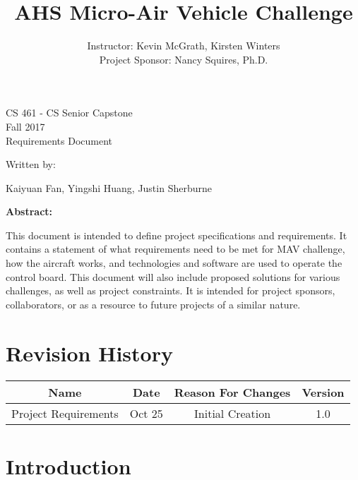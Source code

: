 \documentclass[letterpaper, 10, draftclsnofoot, onecolumn]{IEEEtran}
\date{}
\title{AHS Micro-Air Vehicle Challenge}
\author{ Instructor: Kevin McGrath, Kirsten Winters \\
    Project Sponsor: Nancy Squires, Ph.D.
}
\def\class{CS 461 - CS Senior Capstone}
\def\term{Fall 2017}
\begin{document}
\null  %
\nointerlineskip  %
\vfill
\let\snewpage \newpage
\let\newpage \relax
\maketitle
\begin{center}
\class\\
\term\\
\huge{Requirements Document}\par
\vspace{2mm}
\large{Written by:}\par
\normalsize{Kaiyuan Fan, Yingshi Huang, Justin Sherburne}\par
\vspace{8mm}
\large{\textbf{Abstract:}}\par 
\end{center}
\vspace{2mm}
\normalsize{
This document is intended to define project specifications and requirements. It contains a statement of what requirements need to be met for MAV challenge, how the aircraft works, and technologies and software are used to operate the control board. This document will also include proposed solutions for various challenges, as well as project constraints. It is intended for project sponsors, collaborators, or as a resource to future projects of a similar nature.

}

\let \newpage \snewpage
\vfill 
\break %

\tableofcontents


\section*{Revision History}

\begin{center}
    \begin{tabular}{|c|c|c|c|}
        \hline
	    Name & Date & Reason For Changes & Version\\
        \hline
	    Project Requirements & Oct 25 & Initial Creation & 1.0\\
        \hline
    \end{tabular}
\end{center}

\section{Introduction}
\end{document}
